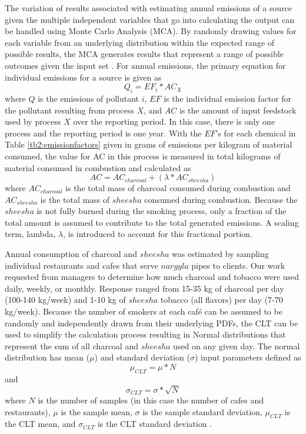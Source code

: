 The variation of results associated with estimating annual emissions of a source given the multiple independent variables that go into calculating the output can be handled using Monte Carlo Analysis (MCA).  By randomly drawing values for each variable from an underlying distribution within the expected range of possible results, the MCA generates results that represent a range of possible outcomes given the input set \citep{Johnson2011}.  For annual emissions, the primary equation for individual emissions for a source is given as
%
\begin{equation}
\label{eq1}
Q_{i} = EF_{i} * AC_{X}
\end{equation}
%
\noindent
where $Q$ is the emissions of pollutant $i$, $EF$ is the individual emission factor for the pollutant resulting from process $X$, and $AC$ is the amount of input feedstock used by process $X$ over the reporting period.  In this case, there is only one process and the reporting period is one year.  With the $EF$’s for each chemical in Table \ref{tb2:emissionfactors} given in grams of emissions per kilogram of material consumed, the value for AC in this process is measured in total kilograms of material consumed in combustion and calculated as
%
\begin{equation}
\label{eq2}
AC = AC_{charcoal} + ( \lambda * AC_{sheesha} )
\end{equation}
%
\noindent
where $AC_{charcoal}$ is the total mass of charcoal consumed during combustion and $AC_{sheesha}$ is the total mass of $sheesha$ consumed during combustion.  Because the $sheesha$ is not fully burned during the smoking process, only a fraction of the total amount is assumed to contribute to the total generated emissions.  A scaling term, lambda, $\lambda$, is introduced to account for this fractional portion. 

Annual consumption of charcoal and $sheesha$ was estimated by sampling individual restaurants and cafes that serve $nargyla$ pipes to clients.  Our work requested from  managers to determine how much charcoal and tobacco were used daily, weekly, or monthly.  Response ranged from 15-35 kg of charcoal per day (100-140 kg/week) and 1-10 kg of $sheesha$ tobacco (all flavors) per day (7-70 kg/week).  Because the number of smokers at each café can be assumed to be randomly and independently drawn from their underlying PDFs, the CLT can be used to simplify the calculation process resulting in Normal distributions that represent the sum of all charcoal and $sheesha$ used on any given day.  The normal distribution has mean ($\mu$) and standard deviation ($\sigma$) input parameters defined as
%
\begin{equation}
\label{eq3}
\mu_{CLT}= \mu*N
\end{equation}
%
\noindent
and 
%
\begin{equation}
\label{eq4}
\sigma_{CLT}= \sigma*\sqrt{N}
\end{equation}
%
\noindent
where $N$ is the number of samples (in this case the number of cafes and restaurants), $\mu$ is the sample mean, $\sigma$ is the sample standard deviation, $\mu_{CLT}$ is the CLT mean, and $\sigma_{CLT}$ is the CLT standard deviation \citep{Ott1981}. 


